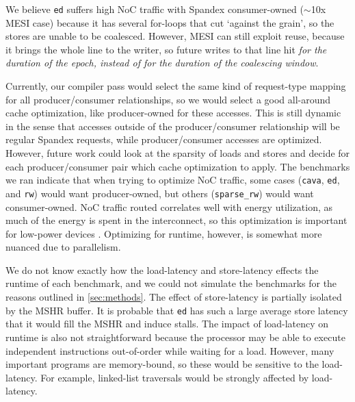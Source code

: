 We believe \verb+ed+ suffers high NoC traffic with Spandex consumer-owned (\(\sim\)10x MESI case) because it has several for-loops that cut `against the grain', so the stores are unable to be coalesced. However, MESI can still exploit reuse, because it brings the whole line to the writer, so future writes to that line hit \textit{for the duration of the epoch, instead of for the duration of the coalescing window}.

Currently, our compiler pass would select the same kind of request-type mapping for all producer/consumer relationships, so we would select a good all-around cache optimization, like producer-owned for these accesses. This is still dynamic in the sense that accesses outside of the producer/consumer relationship will be regular Spandex requests, while producer/consumer accesses are optimized. However, future work could look at the sparsity of loads and stores and decide for each producer/consumer pair which cache optimization to apply. The benchmarks we ran indicate that when trying to optimize NoC traffic, some cases  (\verb+cava+, \verb+ed+, and \verb+rw+) would want producer-owned, but others (\verb+sparse_rw+) would want consumer-owned. NoC traffic routed correlates well with energy utilization, as much of the energy is spent in the interconnect, so this optimization is important for low-power devices \cite{low_energy_FPGA}. Optimizing for runtime, however, is somewhat more nuanced due to parallelism.

We do not know exactly how the load-latency and store-latency effects the runtime of each benchmark, and we could not simulate the benchmarks for the reasons outlined in \cref{sec:methods}. The effect of store-latency is partially isolated by the MSHR buffer. It is probable that \verb+ed+ has such a large average store latency that it would fill the MSHR and induce stalls. The impact of load-latency on runtime is also not straightforward because the processor may be able to execute independent instructions out-of-order while waiting for a load. However, many important programs are memory-bound, so these would be sensitive to the load-latency. For example, linked-list traversals would be strongly affected by load-latency.